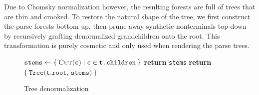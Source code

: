 \documentclass[sigplan,review,anonymous,acmsmall]{acmart}\settopmatter{printfolios=false,printccs=false,printacmref=false}
\begin{document}
Due to Chomsky normalization however, the resulting forests are full of trees that are thin and crooked. To restore the natural shape of the tree, we first construct the parse forests bottom-up, then prune away synthetic nonterminals top-down by recursively grafting denormalized grandchildren onto the root. This transformation is purely cosmetic and only used when rendering the parse trees.

\begin{figure}[H]
  \begin{minipage}{.45\linewidth}
    \begin{algorithm}[H]
      \caption{Tree denormalization}\label{alg:cap}
      \begin{algorithmic}
          \State $\texttt{stems} \leftarrow \{\:\textsc{Cut}(\texttt{c}) \mid \texttt{c} \in \texttt{t.children}\:\}$
            \State \textbf{return } \texttt{stems} %
          \Else%
            \State \textbf{return } $\{\:\texttt{Tree(t.root, stems)}\:\}$
          \EndIf
        \EndProcedure
      \end{algorithmic}
    \end{algorithm}
  \end{minipage}
\end{figure}
\end{document}
